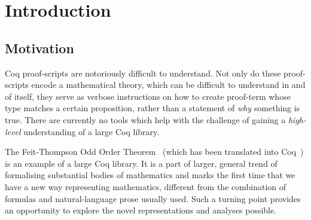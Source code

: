 \chapter{Introduction}





\section{Motivation}

Coq proof-scripts are notoriously difficult to understand. Not only do these
proof-scripts encode a mathematical theory, which can be difficult to
understand in and of itself, they serve as verbose instructions on how to
create proof-term whose type matches a certain proposition, rather than a
statement of \emph{why} something is true. There are currently no tools which
help with the challenge of gaining a \emph{high-level} understanding of a large
Coq library.

The Feit-Thompson Odd Order Theorem~\cite{peterfalvi2000oot, bender1994oot}
(which has been translated into Coq~\cite{gonthier2013oot}) is an example of a
large Coq library. It is a part of larger, general trend of formalising
substantial bodies of mathematics and marks the first time that we have a new
way representing mathematics, different from the combination of formulas and
natural-language prose usually used. Such a turning point provides an
opportunity to explore the novel representations and analyses possible.

